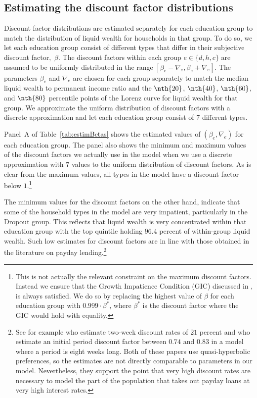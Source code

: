 \documentclass[../HAFiscal]{subfiles}
\begin{document}
\subsection{Estimating the discount factor distributions} 
\label{sec:estimBetas}

Discount factor distributions are estimated separately for each education group to match the distribution of liquid wealth for households in that group. To do so, we let each education group consist of different types that differ in their subjective discount factor,~$\beta$. The discount factors within each group $e\in \{d, h, c\}$ are assumed to be uniformly distributed in the range $[\beta_e-\nabla_e, \beta_e+\nabla_e]$. The parameters $\beta_e$ and $\nabla_e$ are chosen for each group separately to match the median liquid wealth to permanent income ratio and the $\nth{20}$, $\nth{40}$, $\nth{60}$, and $\nth{80}$ percentile points of the Lorenz curve for liquid wealth for that group. We approximate the uniform distribution of discount factors with a discrete approximation and let each education group consist of $7$ different types.

Panel~A of Table~\ref{tab:estimBetas} shows the estimated values of $(\beta_e, \nabla_e)$ for each education group. The panel also shows the minimum and maximum values of the discount factors we actually use in the model when we use a discrete approximation with $7$ values to the uniform distribution of discount factors.  As is clear from the maximum values, all types in the model have a discount factor below $1$.\footnote{This is not actually the relevant constraint on the maximum discount factors. Instead we ensure that the Growth Impatience Condition (GIC) discussed in \cite{carroll2022theoretical}, is always satisfied. We do so by replacing the highest value of $\beta$ for each education group with $0.999\cdot\beta^{*}$, where $\beta^{*}$ is the discount factor where the GIC would hold with equality.}

The minimum values for the discount factors on the other hand, indicate that some of the household types in the model are very impatient, particularly in the Dropout group. This reflects that liquid wealth is very concentrated within that education group with the top quintile holding $96.4$ percent of within-group liquid wealth. Such low estimates for discount factors are in line with those obtained in the literature on payday lending.\footnote{See for example \cite{skiba2008payday} who estimate two-week discount rates of $21$ percent and \cite{allcott2021high} who estimate an initial period discount factor between $0.74$ and $0.83$ in a model where a period is eight weeks long. Both of these papers use quasi-hyperbolic preferences, so the estimates are not directly comparable to parameters in our model. Nevertheless, they support the point that very high discount rates are necessary to model the part of the population that takes out payday loans at very high interest rates.} 
\end{document}
